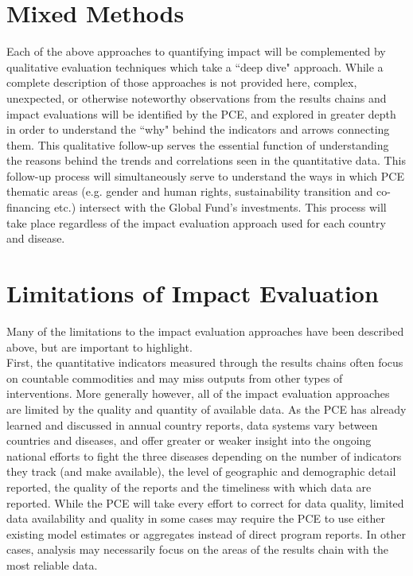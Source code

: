 \documentclass[twocolumn]{bmcart}%
\begin{document}
\section{Mixed Methods}

Each of the above approaches to quantifying impact will be complemented by qualitative evaluation techniques which take a ``deep dive" approach. While a complete description of those approaches is not provided here, complex, unexpected, or otherwise noteworthy observations from the results chains and impact evaluations will be identified by the PCE, and explored in greater depth in order to understand the ``why" behind the indicators and arrows connecting them. This qualitative follow-up serves the essential function of understanding the reasons behind the trends and correlations seen in the quantitative data. This follow-up process will simultaneously serve to understand the ways in which PCE thematic areas (e.g. gender and human rights, sustainability transition and co-financing etc.) intersect with the Global Fund's investments. This process will take place regardless of the impact evaluation approach used for each country and disease. \\


\section{Limitations of Impact Evaluation}
Many of the limitations to the impact evaluation approaches have been described above, but are important to highlight. \\

First, the quantitative indicators measured through the results chains often focus on countable commodities and may miss outputs from other types of interventions. More generally however, all of the impact evaluation approaches are limited by the quality and quantity of available data. As the PCE has already learned and discussed in annual country reports, data systems vary between countries and diseases, and offer greater or weaker insight into the ongoing national efforts to fight the three diseases depending on the number of indicators they track (and make available), the level of geographic and demographic detail reported, the quality of the reports and the timeliness with which data are reported. While the PCE will take every effort to correct for data quality, limited data availability and quality in some cases may require the PCE to use either existing model estimates or aggregates instead of direct program reports. In other cases, analysis may necessarily focus on the areas of the results chain with the most reliable data. \\
\end{document}
